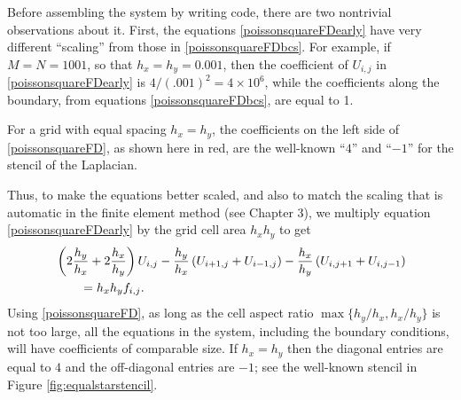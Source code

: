 Before assembling the system by writing \PETSc code, there are two nontrivial observations about it.  First, the equations \eqref{poissonsquareFDearly} have very different ``scaling'' from those in \eqref{poissonsquareFDbcs}.  For example, if $M=N=1001$, so that $h_x=h_y=0.001$, then the coefficient of $U_{i,j}$ in \eqref{poissonsquareFDearly} is $4/(.001)^2 = 4 \times 10^6$, while the coefficients along the boundary, from equations \eqref{poissonsquareFDbcs}, are equal to 1.

\begin{marginfigure}
\caption{For a grid with equal spacing $h_x=h_y$, the coefficients on the left side of \eqref{poissonsquareFD}, as shown here in {\color{red} red}, are the well-known ``$4$'' and ``$-1$'' for the stencil of the Laplacian.}
\label{fig:equalstarstencil}
\end{marginfigure}

Thus, to make the equations better scaled, and also to match the scaling that is automatic in the finite element method (see Chapter 3), we multiply equation \eqref{poissonsquareFDearly} by the grid cell area $h_x h_y$ to get
\begin{align}
&\left(2 \frac{h_y}{h_x} + 2 \frac{h_x}{h_y}\right) U_{i,j} - \frac{h_y}{h_x}\left(U_{i+1,j} + U_{i-1,j}\right)  - \frac{h_x}{h_y}\left(U_{i,j+1} + U_{i,j-1}\right) \label{poissonsquareFD} \\
&\qquad = h_x h_y f_{i,j}. \notag
\end{align}
Using \eqref{poissonsquareFD}, as long as the cell aspect ratio $\max\{h_y/h_x,h_x/h_y\}$ is not too large, all the equations in the system, including the boundary conditions, will have coefficients of comparable size.  If $h_x=h_y$ then the diagonal entries are equal to $4$ and the off-diagonal entries are $-1$; see the well-known stencil in Figure \ref{fig:equalstarstencil}.

